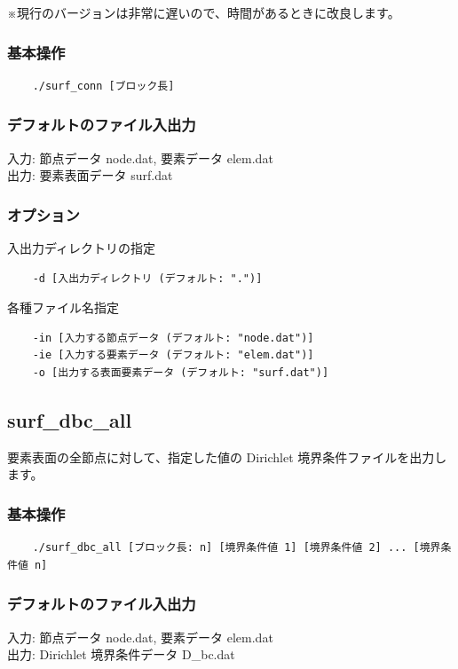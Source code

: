 \documentclass[8pt,a4paper]{article}
\begin{document}
※現行のバージョンは非常に遅いので、時間があるときに改良します。

\subsubsection*{基本操作}
\begin{verbatim}
    ./surf_conn [ブロック長]
\end{verbatim}

\subsubsection*{デフォルトのファイル入出力}
入力: 節点データ node.dat, 要素データ elem.dat \\ \noindent
出力: 要素表面データ surf.dat

\subsubsection*{オプション}
入出力ディレクトリの指定
\begin{verbatim}
    -d [入出力ディレクトリ (デフォルト: ".")]
\end{verbatim}
各種ファイル名指定
\begin{verbatim}
    -in [入力する節点データ (デフォルト: "node.dat")]
    -ie [入力する要素データ (デフォルト: "elem.dat")]
    -o [出力する表面要素データ (デフォルト: "surf.dat")]
\end{verbatim}

\subsection{surf\_dbc\_all}
要素表面の全節点に対して、指定した値の Dirichlet 境界条件ファイルを出力します。
\subsubsection*{基本操作}
\begin{verbatim}
	./surf_dbc_all [ブロック長: n] [境界条件値 1] [境界条件値 2] ... [境界条件値 n]
\end{verbatim}

\subsubsection*{デフォルトのファイル入出力}
入力: 節点データ node.dat, 要素データ elem.dat \\ \noindent
出力: Dirichlet 境界条件データ D\_bc.dat
\end{document}
